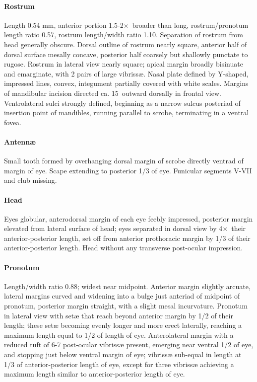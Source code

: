 \documentclass[fleqn,10pt,lineno]{wlpeerj} %
\newcommand{\td}{\textdegree~}
\newcommand{\x}{$\times$~}
\begin{document}
			\paragraph{Rostrum}
				Length 0.54 mm, anterior portion 1.5-2\x broader than long, rostrum/pronotum length ratio 0.57, rostrum length/width ratio 1.10.
				Separation of rostrum from head generally obscure. 
				Dorsal outline of rostrum nearly square, anterior half of dorsal surface mesally concave, posterior half coarsely but shallowly punctate to rugose. 
				Rostrum in lateral view nearly square; apical margin broadly bisinuate and emarginate, with 2 pairs of large vibriss{\ae}. 
				Nasal plate defined by Y-shaped, impressed lines, convex, integument partially covered with white scales.
				Margins of mandibular incision directed ca. 15\td outward dorsally in frontal view. 
				Ventrolateral sulci strongly defined, beginning as a narrow sulcus posteriad of insertion point of mandibles, running parallel to scrobe, terminating in a ventral fovea.
			\paragraph{Antenn{\ae}}
				Small tooth formed by overhanging dorsal margin of scrobe directly ventrad of margin of eye.
				Scape extending to posterior 1/3 of eye.
				Funicular segments V-VII and club missing.
			\paragraph{Head}
				Eyes globular, anterodorsal margin of each eye feebly impressed, posterior margin elevated from lateral surface of head; eyes separated in dorsal view by 4\x their anterior-posterior length, set off from anterior prothoracic margin by 1/3 of their anterior-posterior length. 
				Head without any transverse post-ocular impression.
			\paragraph{Pronotum}
				Length/width ratio 0.88; widest near midpoint. 
				Anterior margin slightly arcuate, lateral margins curved and widening into a bulge just anteriad of midpoint of pronotum, posterior margin straight, with a slight mesal incurvature. 
				Pronotum in lateral view with set{\ae} that reach beyond anterior margin by 1/2 of their length; these set{\ae} becoming evenly longer and more erect laterally, reaching a maximum length equal to 1/2 of length of eye. 
				Anterolateral margin with a reduced tuft of 6-7 post-ocular vibriss{\ae} present, emerging near ventral 1/2 of eye, and stopping just below ventral margin of eye; vibriss{\ae} sub-equal in length at 1/3 of anterior-posterior length of eye, except for three vibriss{\ae} achieving a maximum length similar to anterior-posterior length of eye.
\end{document}
